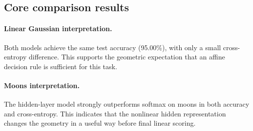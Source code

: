 \documentclass[sigconf,screen,nonacm]{acmart}
\begin{document}
\subsection{Core comparison results}
\begin{table}[t]
    \centering
    \caption{Core results on synthetic tasks. Validation values are the best validation checkpoint by minimum validation cross-entropy.}
    \label{tab:core-results}
\end{table}

\paragraph{Linear Gaussian interpretation.}
Both models achieve the same test accuracy (95.00\%), with only a small cross-entropy difference. This supports the geometric expectation that an affine decision rule is sufficient for this task.

\paragraph{Moons interpretation.}
The hidden-layer model strongly outperforms softmax on moons in both accuracy and cross-entropy. This indicates that the nonlinear hidden representation changes the geometry in a useful way before final linear scoring.
\end{document}
